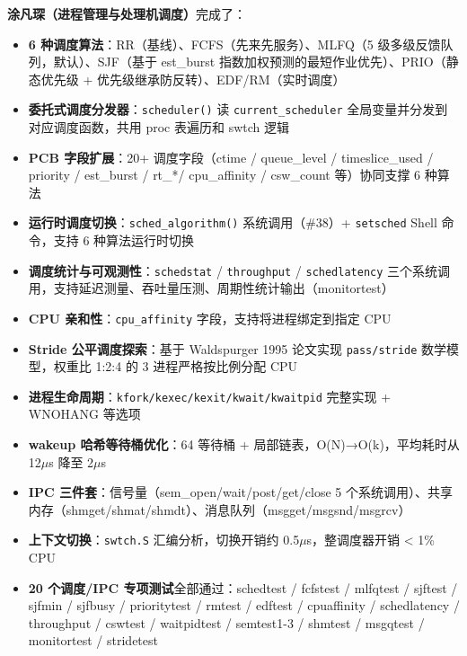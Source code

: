 \documentclass[12pt,a4paper]{ctexart}
\begin{document}
\textbf{涂凡琛（进程管理与处理机调度）}完成了：
\begin{itemize}
  \item \textbf{6 种调度算法}：RR（基线）、FCFS（先来先服务）、MLFQ（5 级多级反馈队列，默认）、SJF（基于 est\_burst 指数加权预测的最短作业优先）、PRIO（静态优先级 + 优先级继承防反转）、EDF/RM（实时调度）
  \item \textbf{委托式调度分发器}：\texttt{scheduler()} 读 \texttt{current\_scheduler} 全局变量并分发到对应调度函数，共用 proc 表遍历和 swtch 逻辑
  \item \textbf{PCB 字段扩展}：20+ 调度字段（ctime / queue\_level / timeslice\_used / priority / est\_burst / rt\_*/ cpu\_affinity / csw\_count 等）协同支撑 6 种算法
  \item \textbf{运行时调度切换}：\texttt{sched\_algorithm()} 系统调用（\#38）+ \texttt{setsched} Shell 命令，支持 6 种算法运行时切换
  \item \textbf{调度统计与可观测性}：\texttt{schedstat} / \texttt{throughput} / \texttt{schedlatency} 三个系统调用，支持延迟测量、吞吐量压测、周期性统计输出（monitortest）
  \item \textbf{CPU 亲和性}：\texttt{cpu\_affinity} 字段，支持将进程绑定到指定 CPU
  \item \textbf{Stride 公平调度探索}：基于 Waldspurger 1995 论文实现 \texttt{pass/stride} 数学模型，权重比 1:2:4 的 3 进程严格按比例分配 CPU
  \item \textbf{进程生命周期}：\texttt{kfork/kexec/kexit/kwait/kwaitpid} 完整实现 + WNOHANG 等选项
  \item \textbf{wakeup 哈希等待桶优化}：64 等待桶 + 局部链表，O(N)→O(k)，平均耗时从 12$\mu$s 降至 2$\mu$s
  \item \textbf{IPC 三件套}：信号量（sem\_open/wait/post/get/close 5 个系统调用）、共享内存（shmget/shmat/shmdt）、消息队列（msgget/msgsnd/msgrcv）
  \item \textbf{上下文切换}：\texttt{swtch.S} 汇编分析，切换开销约 0.5$\mu$s，整调度器开销 < 1\% CPU
  \item \textbf{20 个调度/IPC 专项测试}全部通过：schedtest / fcfstest / mlfqtest / sjftest / sjfmin / sjfbusy / prioritytest / rmtest / edftest / cpuaffinity / schedlatency / throughput / cswtest / waitpidtest / semtest1-3 / shmtest / msgqtest / monitortest / stridetest
\end{itemize}
\end{document}
